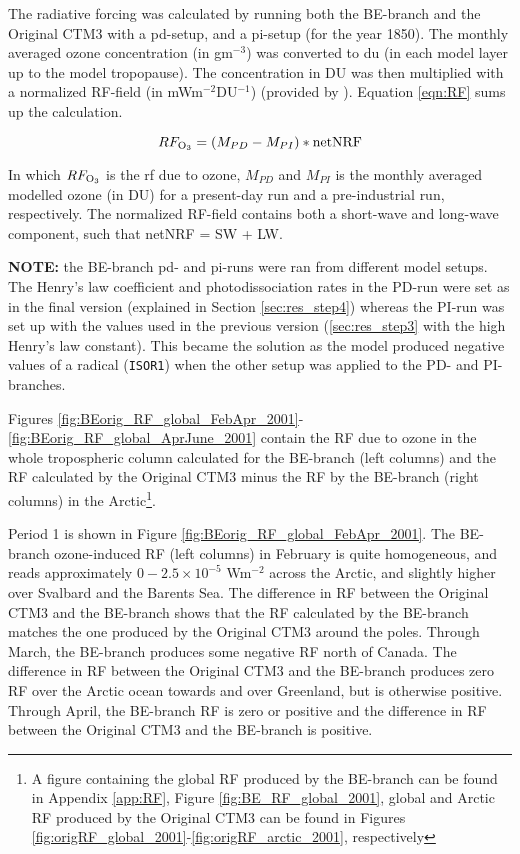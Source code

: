 The radiative forcing was calculated by running both the BE-branch and the Original CTM3 with a \acrlong{pd}-setup, and a \acrlong{pi}-setup (for the year 1850). The monthly averaged ozone concentration (in gm$^{-3}$) was converted to \acrlong{du} (in each model layer up to the model tropopause). The concentration in DU was then multiplied with a normalized RF-field (in mWm$^{-2}$DU$^{-1}$) (provided by \cite{MariannePersonal}). Equation \ref{eqn:RF} sums up the calculation.

\begin{equation}
    RF_{\mathrm{O_3}} = (M_{PD} - M_{PI})*\text{netNRF}
    \label{eqn:RF}
\end{equation}

In which $RF_{\mathrm{O_3}}$ is the \acrshort{rf} due to ozone, $M_{PD}$ and $M_{PI}$ is the monthly averaged modelled ozone (in DU) for a present-day run and a pre-industrial run, respectively. The normalized RF-field contains both a short-wave and long-wave component, such that netNRF = SW + LW.

\medskip

\textbf{NOTE:} the BE-branch \acrshort{pd}- and \acrshort{pi}-runs were ran from different model setups. The Henry's law coefficient and photodissociation rates in the PD-run were set as in the final version (explained in Section \ref{sec:res_step4}) whereas the PI-run was set up with the values used in the previous version (\ref{sec:res_step3} with the high Henry's law constant). This became the solution as the model produced negative values of a radical (\texttt{ISOR1}) when the other setup was applied to the PD- and PI-branches. 

\medskip

Figures \ref{fig:BEorig_RF_global_FebApr_2001}-\ref{fig:BEorig_RF_global_AprJune_2001} contain the RF due to ozone in the whole tropospheric column calculated for the BE-branch (left columns) and the RF calculated by the Original CTM3 minus the RF by the BE-branch (right columns) in the Arctic\footnote{A figure containing the global RF produced by the BE-branch can be found in Appendix \ref{app:RF}, Figure \ref{fig:BE_RF_global_2001}, global and Arctic RF produced by the Original CTM3 can be found in Figures \ref{fig:origRF_global_2001}-\ref{fig:origRF_arctic_2001}, respectively}. 
\medskip 

Period 1 is shown in Figure \ref{fig:BEorig_RF_global_FebApr_2001}. The BE-branch ozone-induced RF (left columns) in February is quite homogeneous, and reads approximately $0-2.5\times10^{-5}$ Wm$^{-2}$ across the Arctic, and slightly higher over Svalbard and the Barents Sea. The difference in RF between the Original CTM3 and the BE-branch shows that the RF calculated by the BE-branch matches the one produced by the Original CTM3 around the poles. Through March, the BE-branch produces some negative RF north of Canada. The difference in RF between the Original CTM3 and the BE-branch produces zero RF over the Arctic ocean towards and over Greenland, but is otherwise positive. Through April, the BE-branch RF is zero or positive and the difference in RF between the Original CTM3 and the BE-branch is positive.

